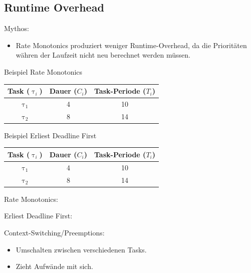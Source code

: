 \subsection{Runtime Overhead}\label{RuntimeOverhead}
\begin{frame}{\subsecname}
	Mythos:
	\begin{itemize}
		\item Rate Monotonics produziert weniger Runtime-Overhead, da die Prioritäten währen der Laufzeit nicht neu berechnet werden müssen.
	\end{itemize}
\end{frame}

\newcommand{\showRMSlideRO}[1] {\begin{frame}{Beispiel Rate Monotonics}
	\begin{center}
		\begin{tabular}{c||c|c}
			Task ($\uptau_i$) & Dauer ($C_i$) & Task-Periode ($T_i$)\\\hline\hline
			$\uptau_1$ & 4 & 10\\
			$\uptau_2$ & 8 & 14
		\end{tabular}
	\end{center}
	
\end{frame}}

%
{%
	\showRMSlideRO{\arabic{ct}}
}

\begin{frame}{Beispiel Erliest Deadline First}
	\begin{center}
		\begin{tabular}{c||c|c}
			Task ($\uptau_i$) & Dauer ($C_i$) & Task-Periode ($T_i$)\\\hline\hline
			$\uptau_1$ & 4 & 10\\
			$\uptau_2$ & 8 & 14
		\end{tabular}
	\end{center}
	
\end{frame}

\begin{frame}{\subsecname}
	Rate Monotonics:
	
	Erliest Deadline First:
	
\end{frame}

\begin{frame}{\subsecname}
	Context-Switching/Preemptions:
	\begin{itemize}
		\item Umschalten zwischen verschiedenen Tasks.
		\item Zieht Aufwände mit sich.
	\end{itemize}
\end{frame}

